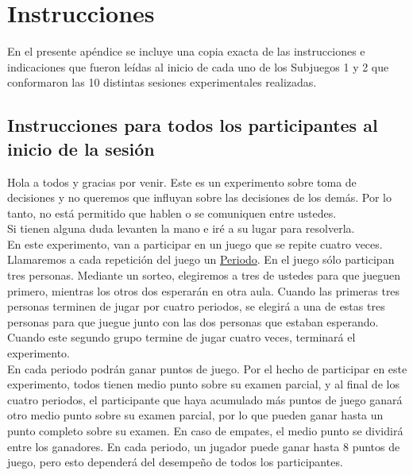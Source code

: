 
\chapter{Instrucciones} %

\label{App_Inst} %

En el presente apéndice se incluye una copia exacta de las instrucciones e indicaciones que fueron leídas al inicio de cada uno de los Subjuegos 1 y 2 que conformaron las 10 distintas sesiones experimentales realizadas.\\

\section{Instrucciones para todos los participantes al inicio de la sesión}

Hola a todos y gracias por venir. Este es un experimento sobre toma de decisiones y no queremos que influyan sobre las decisiones de los demás. Por lo tanto, no está permitido que hablen o se comuniquen entre ustedes.\\

Si tienen alguna duda levanten la mano e iré a su lugar para resolverla.\\

En este experimento, van a participar en un juego que se repite cuatro veces. Llamaremos a cada repetición del juego un \underline{Periodo}. En el juego sólo participan tres personas. Mediante un sorteo, elegiremos a tres de ustedes para que jueguen primero, mientras los otros dos esperarán en otra aula. Cuando las primeras tres personas terminen de jugar por cuatro periodos, se elegirá a una de estas tres personas para que juegue junto con las dos personas que estaban esperando. Cuando este segundo grupo termine de jugar cuatro veces, terminará el experimento.\\

En cada periodo podrán ganar puntos de juego. Por el hecho de participar en este experimento, todos tienen medio punto sobre su examen parcial, y al final de los cuatro periodos, el participante que haya acumulado más puntos de juego ganará otro medio punto sobre su examen parcial, por lo que pueden ganar hasta un punto completo sobre su examen. En caso de empates, el medio punto se dividirá entre los ganadores. En cada periodo, un jugador puede ganar hasta 8 puntos de juego, pero esto dependerá del desempeño de todos los participantes.\\

